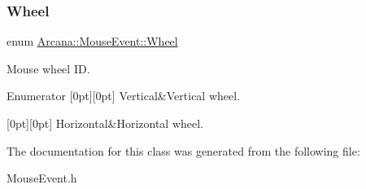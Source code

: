 \subsubsection{\texorpdfstring{Wheel}{Wheel}}
{\footnotesize\ttfamily enum \mbox{\hyperlink{class_arcana_1_1_mouse_event_aa658cf03c3ae261e9552804c0e0a46dd}{Arcana\+::\+Mouse\+Event\+::\+Wheel}}}



Mouse wheel ID. 

\begin{DoxyEnumFields}{Enumerator}
[0pt][0pt]{}\mbox{\label{class_arcana_1_1_mouse_event_aa658cf03c3ae261e9552804c0e0a46dda42b46757e2b876a14045d2ce8e4a5302}} 
Vertical&Vertical wheel. \\
\hline

[0pt][0pt]{}\mbox{\label{class_arcana_1_1_mouse_event_aa658cf03c3ae261e9552804c0e0a46dda5c63bd8a3472b3726d58675251036727}} 
Horizontal&Horizontal wheel. \\
\hline

\end{DoxyEnumFields}


The documentation for this class was generated from the following file\+:\begin{DoxyCompactItemize}
\item 
Mouse\+Event.\+h\end{DoxyCompactItemize}
